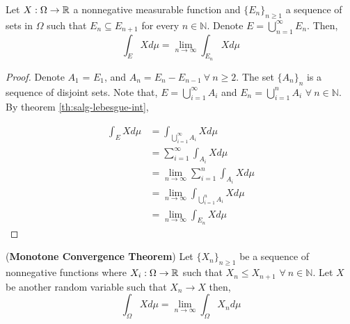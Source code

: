 \documentclass[../TGMAFFIRO.tex]{subfiles}
\begin{document}
\begin{corollary} \label{cor:partition_limit_integral}
	Let $X: \Omega \to \mathbb{R}$ a nonnegative measurable function and $\{E_n\}_{n\geq 1}$ a sequence of sets in $\Omega$ such that $E_n \subseteq E_{n+1}$ for every $n \in \mathbb{N}$. Denote $E = \bigcup_{n=1}^{\infty} E_n$. Then,
	\begin{equation}
		\int_E X d\mu = \lim_{n\to \infty} \int_{E_n} X d\mu
	\end{equation}
\end{corollary}

\begin{proof}
	Denote $A_1$ = $E_1$, and $A_n = E_n - E_{n-1} \ \forall \ n \geq 2$. The set $\{A_n\}_n$ is a sequence of disjoint sets. Note that, $E = \bigcup_{i=1}^\infty A_i$ and $E_n = \bigcup_{i=1}^n A_i$ $\forall \ n \in \mathbb{N}$.\\
	
	By theorem \ref{th:salg-lebesgue-int},
	
	\begin{align*}
		\int_E X d\mu &= \int_{\bigcup_{i=1}^{\infty} A_i} X d\mu \\
		&= \sum_{i=1}^{\infty} \int_{A_i} X d\mu \\
		&= \lim_{n\to\infty} \sum_{i=1}^{n} \int_{A_i} X d\mu \\ 
		&= \lim_{n\to\infty} \int_{\bigcup_{i=1}^{n} A_i} X d\mu \\
		&= \lim_{n\to\infty} \int_{E_n} X d\mu
	\end{align*}
\end{proof}


\begin{theorem} (\textbf{Monotone Convergence Theorem})
Let $\{X_n\}_{n\geq 1}$ be a sequence of nonnegative functions where $X_i: \Omega \to \mathbb{R}$ such that $X_n \leq X_{n+1}$ $\forall \ n \in \mathbb{N}$. Let $X$ be another random variable such that $X_n \to X$ then,
\begin{equation}
	\int_\Omega X d\mu = \lim_{n\to \infty} \int_\Omega X_n d\mu
\end{equation}
\end{theorem}
\end{document}
